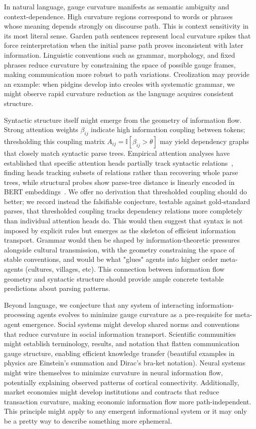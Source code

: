 \documentclass[11pt]{article}
\begin{document}
In natural language, gauge curvature manifests as semantic ambiguity and context-dependence. High curvature regions correspond to words or phrases whose meaning depends strongly on discourse path. This is context sensitivity in its most literal sense. Garden path sentences represent local curvature spikes that force reinterpretation when the initial parse path proves inconsistent with later information. Linguistic conventions such as grammar, morphology, and fixed phrases reduce curvature by constraining the space of possible gauge frames, making communication more robust to path variations. Creolization may provide an example: when pidgins develop into creoles with systematic grammar, we might observe rapid curvature reduction as the language acquires consistent structure.

Syntactic structure itself might emerge from the geometry of information flow. Strong attention weights $\beta_{ij}$ indicate high information coupling between tokens; thresholding this coupling matrix $A_{ij} = \mathbb{I}[\beta_{ij} > \theta]$ may yield dependency graphs that closely match syntactic parse trees. Empirical attention analyses have established that specific attention heads partially track syntactic relations~\cite{Clark2019, Voita2019}, finding heads tracking subsets of relations rather than recovering whole parse trees, while structural probes show parse-tree distance is linearly encoded in BERT embeddings~\cite{Hewitt2019}. We offer no derivation that thresholded coupling should do better; we record instead the falsifiable conjecture, testable against gold-standard parses, that thresholded coupling tracks dependency relations more completely than individual attention heads do. This would then suggest that syntax is not imposed by explicit rules but emerges as the skeleton of efficient information transport. Grammar would then be shaped by information-theoretic pressures alongside cultural transmission, with the geometry constraining the space of stable conventions, and would be what "glues" agents into higher order meta-agents (cultures, villages, etc). This connection between information flow geometry and syntactic structure should provide ample concrete testable predictions about parsing patterns.

Beyond language, we conjecture that any system of interacting information-processing agents evolves to minimize gauge curvature as a pre-requisite for meta-agent emergence. Social systems might develop shared norms and conventions that reduce curvature in social information transport. Scientific communities might establish terminology, results, and notation that flatten communication gauge structure, enabling efficient knowledge transfer (beautiful examples in physics are Einstein's summation and Dirac's bra-ket notation). Neural systems might wire themselves to minimize curvature in neural information flow, potentially explaining observed patterns of cortical connectivity. Additionally, market economies might develop institutions and contracts that reduce transaction curvature, making economic information flow more path-independent.  This principle might apply to any emergent informational system or it may only be a pretty way to describe something more ephemeral.
\end{document}
